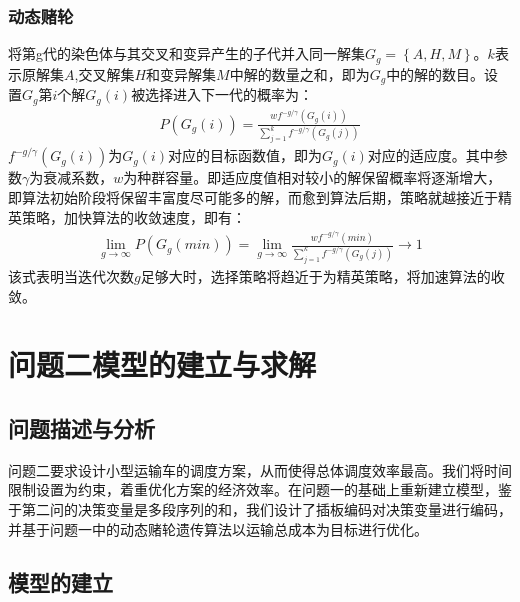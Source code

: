 \documentclass{whutmod}
\begin{document}
         \subsubsection{动态赌轮}
         将第g代的染色体与其交叉和变异产生的子代并入同一解集$G_g=\left \{A,H,M\right \}$。$k$表示原解集$A$,交叉解集$H$和变异解集$M$中解的数量之和，即为$G_g$中的解的数目。设置$G_g$第$i$个解$G_g(i)$被选择进入下一代的概率为：
         \begin{gather}
          P(G_{g}(i))=\frac{wf^{-g/\gamma }(G_{g}(i))}{\sum_{j=1}^{k}f^{-g/\gamma }(G_{g}(j))}
         \end{gather}
         $f^{-g/\gamma }(G_{g}(i))$为$G_{g}(i)$对应的目标函数值，即为$G_{g}(i)$对应的适应度。其中参数$\gamma$为衰减系数，$w$为种群容量。即适应度值相对较小的解保留概率将逐渐增大，
         即算法初始阶段将保留丰富度尽可能多的解，而愈到算法后期，策略就越接近于精英策略，加快算法的收敛速度，即有：
           \begin{gather}
           \lim_{g\rightarrow \infty } P(G_{g}(min))=\lim_{g\rightarrow \infty }\frac{wf^{-g/\gamma }(min)}{\sum_{j=1}^{k}f^{-g/\gamma }(G_{g}(j))}\rightarrow 1
         \end{gather}
         该式表明当迭代次数$g$足够大时，选择策略将趋近于为精英策略，将加速算法的收敛。
         
         
         
	  \section{问题二模型的建立与求解}
	  \subsection{问题描述与分析}
	  问题二要求设计小型运输车的调度方案，从而使得总体调度效率最高。我们将时间限制设置为约束，着重优化方案的经济效率。在问题一的基础上重新建立模型，鉴于第二问的决策变量是多段序列的和，我们设计了插板编码对决策变量进行编码，并基于问题一中的动态赌轮遗传算法以运输总成本为目标进行优化。
	  \subsection{模型的建立}
\end{document}
